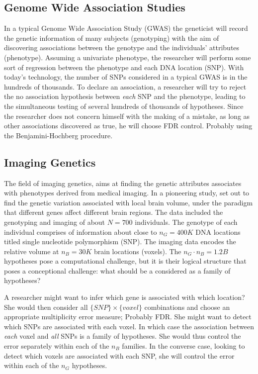 \documentclass[draft,12pt]{article}
\begin{document}
\subsection{Genome Wide Association Studies}
In a typical Genome Wide Association Study (GWAS) the geneticist will record the genetic information of many subjects (genotyping) with the aim of discovering associations between the genotype and the individuals' attributes (phenotype). Assuming a univariate phenotype, the researcher will perform some sort of regression between the phenotype and each DNA location (SNP). With today’s technology, the number of SNPs considered in a typical GWAS is in the hundreds of thousands. To declare an association, a researcher will try to reject the no association hypothesis between \emph{each} SNP and the phenotype, leading to the simultaneous testing of several hundreds of thousands of hypotheses. Since the researcher does not concern himself with the making of a mistake, as long as other associations discovered as true, he will choose FDR control. Probably using the Benjamini-Hochberg procedure.




\subsection{\label{eg:imaging_genetics}Imaging Genetics}
The field of imaging genetics, aims at finding the genetic attributes associates with phenotypes derived from medical imaging. In a pioneering study, \citet{stein_voxelwise_2010} set out to find the genetic variation associated with local brain volume, under the paradigm that different genes affect different brain regions. The data included the genotyping and imaging of about $N=700$ individuals. The genotype of each individual comprises of information about close to $n_G=400K$ DNA locations titled single nucleotide polymorphism (SNP). The imaging data encodes the relative volume at $n_B=30K$ brain locations (voxels). The $n_G \cdot n_B=1.2B$ hypotheses pose a computational challenge, but it is their logical structure that poses a conceptional challenge: what should be a considered as a family of hypotheses?

A researcher might want to infer which gene is associated with which location? She would then consider all $\{SNP\} \times \{voxel\}$ combinations and choose an appropriate multiplicity error measure; Probably FDR. 
She might want to detect which SNPs are associated with each voxel. In which case the association between \emph{each} voxel and \emph{all} SNPs is a family of hypotheses. She would thus control the error separately within each of the $n_B$ families. 
In the converse case, looking to detect which voxels are associated with each SNP, she will control the error within each of the $n_G$ hypotheses.
\end{document}
